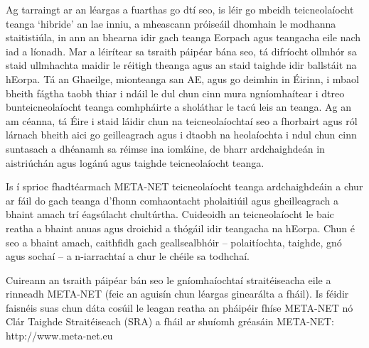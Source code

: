 \begin{multicols}{2}

Ag tarraingt ar an léargas a fuarthas go dtí seo, is léir go mbeidh teicneolaíocht teanga ‘hibride’ an lae inniu, a mheascann próiseáil dhomhain le modhanna staitistiúla, in ann an bhearna idir gach teanga Eorpach agus teangacha eile nach iad a líonadh. Mar a léirítear sa tsraith páipéar bána seo, tá difríocht ollmhór sa staid ullmhachta maidir le réitigh theanga agus an staid taighde idir ballstáit na hEorpa. Tá an Ghaeilge, mionteanga san AE, agus go deimhin in Éirinn, i mbaol bheith fágtha taobh thiar i ndáil le dul chun cinn mura ngníomhaítear i dtreo bunteicneolaíocht teanga comhpháirte a sholáthar le tacú leis an teanga. Ag an am céanna, tá Éire i staid láidir chun na teicneolaíochtaí seo a fhorbairt agus ról lárnach bheith aici go geilleagrach agus i dtaobh na heolaíochta i ndul chun cinn suntasach a dhéanamh sa réimse ina iomláine, de bharr ardchaighdeán in aistriúchán agus logánú agus taighde teicneolaíocht teanga. 

Is í sprioc fhadtéarmach META-NET teicneolaíocht teanga ardchaighdeáin a chur ar fáil do gach teanga d’fhonn comhaontacht pholaitiúil agus gheilleagrach a bhaint amach trí éagsúlacht chultúrtha. Cuideoidh an teicneolaíocht le baic reatha a bhaint anuas agus droichid a thógáil idir teangacha na hEorpa. Chun é seo a bhaint amach, caithfidh gach geallsealbhóir – polaitíochta, taighde, gnó agus sochaí – a n-iarrachtaí a chur le chéile sa todhchaí.

Cuireann an tsraith páipéar bán seo le gníomhaíochtaí straitéiseacha eile a rinneadh META-NET (feic an aguisín chun léargas ginearálta a fháil). Is féidir faisnéis suas chun dáta cosúil le leagan reatha an pháipéir fhíse META-NET \cite{Meta1} nó Clár Taighde Straitéiseach (SRA) a fháil ar shuíomh gréasáin META-NET:  http://www.meta-net.eu

\end{multicols}

\clearpage



